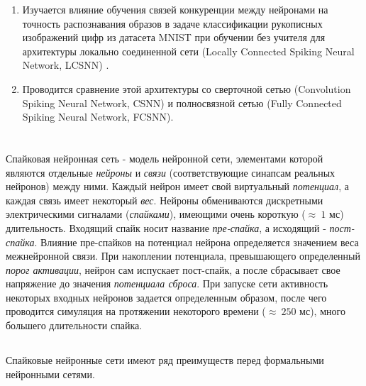 \documentclass[a4paper]{article}
\begin{document}
\begin{enumerate}
\item Изучается влияние обучения связей конкуренции \cite{MaxActiv1, MaxActiv2, hardware_survey} между нейронами на точность распознавания образов в задаче классификации рукописных изображений цифр из датасета MNIST \cite{MNIST} при обучении без учителя для архитектуры локально соединенной сети (Locally Connected Spiking Neural Network, LCSNN) \cite{saunders2019locally}.
 
\item Проводится сравнение этой архитектуры со сверточной сетью (Convolution Spiking Neural Network, CSNN) и полносвязной сетью (Fully Connected Spiking Neural Network, FCSNN).

\end{enumerate}

\clearpage 

\section{}
Спайковая нейронная сеть - модель нейронной сети, элементами которой являются  отдельные \textit{нейроны} и \textit{связи} (соответствующие синапсам реальных нейронов) между ними. Каждый нейрон имеет свой виртуальный \textit{потенциал}, а каждая связь имеет некоторый \textit{вес}. Нейроны обмениваются дискретными электрическими сигналами (\textit{спайками}), имеющими очень короткую ($ \approx ~1$ мс) длительность. Входящий спайк носит название \textit{пре-спайка}, а исходящий - \textit{пост-спайка}.  Влияние пре-спайков на потенциал нейрона определяется значением веса межнейронной связи. При накоплении потенциала, превышающего определенный \textit{порог активации}, нейрон сам испускает пост-спайк, а после сбрасывает свое напряжение до значения \textit{потенциала сброса}. При запуске сети активность некоторых входных нейронов задается определенным образом, после чего проводится симуляция на протяжении некоторого времени ($\approx ~250$ мс), много большего длительности спайка.

\subsection{}
Спайковые нейронные сети имеют ряд преимуществ перед формальными нейронными сетями.
\end{document}
